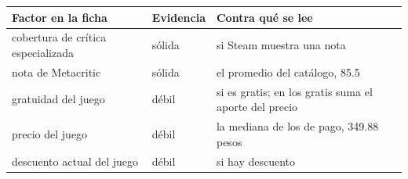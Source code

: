 \begin{tabularx}{\textwidth}{>{\raggedright\arraybackslash}X l >{\raggedright\arraybackslash}p{6.4cm}}
\toprule
Factor en la ficha & Evidencia & Contra qué se lee \\
\midrule
cobertura de crítica especializada & sólida & si Steam muestra una nota \\
nota de Metacritic & sólida & el promedio del catálogo, 85.5 \\
gratuidad del juego & débil & si es gratis; en los gratis suma el aporte del precio \\
precio del juego & débil & la mediana de los de pago, 349.88 pesos \\
descuento actual del juego & débil & si hay descuento \\
\bottomrule
\end{tabularx}
